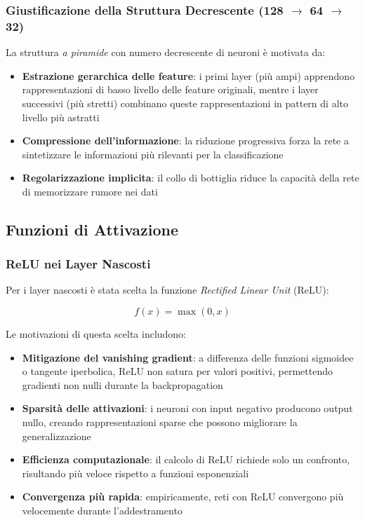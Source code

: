 \subsubsection{Giustificazione della Struttura Decrescente (128 $\rightarrow$ 64 $\rightarrow$ 32)}

La struttura \textit{a piramide} con numero decrescente di neuroni è motivata da:

\begin{itemize}
    \item \textbf{Estrazione gerarchica delle feature}: i primi layer (più ampi) apprendono rappresentazioni di basso livello delle feature originali, mentre i layer successivi (più stretti) combinano queste rappresentazioni in pattern di alto livello più astratti
    \item \textbf{Compressione dell'informazione}: la riduzione progressiva forza la rete a sintetizzare le informazioni più rilevanti per la classificazione
    \item \textbf{Regolarizzazione implicita}: il collo di bottiglia riduce la capacità della rete di memorizzare rumore nei dati
\end{itemize}

\subsection{Funzioni di Attivazione}

\subsubsection{ReLU nei Layer Nascosti}

Per i layer nascosti è stata scelta la funzione \textit{Rectified Linear Unit} (ReLU):

\begin{equation}
    f(x) = \max(0, x)
\end{equation}

Le motivazioni di questa scelta includono:

\begin{itemize}
    \item \textbf{Mitigazione del vanishing gradient}: a differenza delle funzioni sigmoidee o tangente iperbolica, ReLU non satura per valori positivi, permettendo gradienti non nulli durante la backpropagation
    \item \textbf{Sparsità delle attivazioni}: i neuroni con input negativo producono output nullo, creando rappresentazioni sparse che possono migliorare la generalizzazione
    \item \textbf{Efficienza computazionale}: il calcolo di ReLU richiede solo un confronto, risultando più veloce rispetto a funzioni esponenziali
    \item \textbf{Convergenza più rapida}: empiricamente, reti con ReLU convergono più velocemente durante l'addestramento
\end{itemize}


